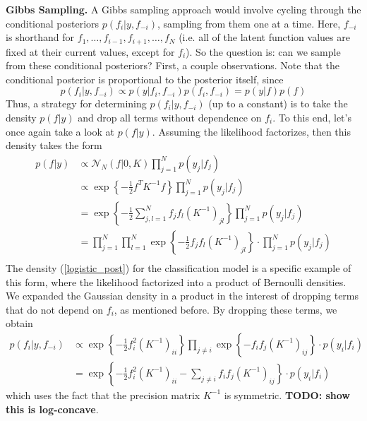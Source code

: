\documentclass[12pt]{article}
\begin{document}
\bigskip
\noindent
\textbf{Gibbs Sampling.} A Gibbs sampling approach would involve cycling through the conditional posteriors $p(f_i|y, f_{-i})$, sampling from them one at a time. 
Here, $f_{-i}$ is shorthand for $f_1, \dots, f_{i - 1}, f_{i + 1}, \dots, f_N$ (i.e. all of the latent function values are fixed at their current values, except for $f_i$). So the question is:
can we sample from these conditional posteriors? First, a couple observations. Note that the conditional posterior is proportional to the posterior itself, since
\[p(f_i|y, f_{-i}) \propto p(y|f_i, f_{-i})p(f_i, f_{-i}) = p(y|f)p(f)\]
Thus, a strategy for determining $p(f_i|y, f_{-i})$ (up to a constant) is to take the density $p(f|y)$ and drop all terms without dependence on $f_i$. To this end, let's once again 
take a look at $p(f|y)$. Assuming the likelihood factorizes, then this density takes the form 
\begin{align*}
p(f|y) &\propto \mathcal{N}_N(f|0, K) \prod_{j = 1}^{N} p(y_j|f_j) \\
	 &\propto \exp\left\{-\frac{1}{2} f^T K^{-1} f \right\} \prod_{j = 1}^{N} p(y_j|f_j) \\
	 &= \exp\left\{-\frac{1}{2} \sum_{j,l = 1}^{N} f_j f_l \left(K^{-1}\right)_{jl} \right\} \prod_{j = 1}^{N} p(y_j|f_j) \\
	 &= \prod_{j = 1}^{N} \prod_{l = 1}^{N} \exp\left\{-\frac{1}{2} f_j f_l \left(K^{-1}\right)_{jl} \right\} \cdot \prod_{j = 1}^{N} p(y_j|f_j) \\
\end{align*}
The density (\ref{logistic_post}) for the classification model is a specific example of this form, where the likelihood factorized into a product of Bernoulli densities. We expanded 
the Gaussian density in a product in the interest of dropping terms that do not depend on $f_i$, as mentioned before. By dropping these terms, we obtain 
\begin{align*}
p(f_i|y, f_{-i}) &\propto \exp\left\{-\frac{1}{2}f_i^2 \left(K^{-1}\right)_{ii} \right\} \prod_{j \neq i} \exp\left\{-f_i f_j \left(K^{-1}\right)_{ij} \right\} \cdot p(y_i|f_i) \\
		    &= \exp\left\{-\frac{1}{2} f_i^2 \left(K^{-1}\right)_{ii} - \sum_{j \neq i} f_i f_j \left(K^{-1}\right)_{ij} \right\} \cdot p(y_i|f_i)
\end{align*}
which uses the fact that the precision matrix $K^{-1}$ is symmetric. \textbf{TODO: show this is log-concave}. 
\end{document}

